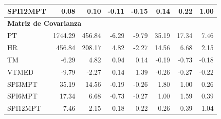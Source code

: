 \begin{table}[ht]
\begin{tabular}{lrrrrrrr}
SPI12MPT & 0.08 & 0.10 & -0.11 & -0.15 & 0.14 & 0.22 & 1.00 \\
\midrule
\multicolumn{8}{l}{\textbf{Matriz de Covarianza}} \\
\midrule
PT       & 1744.29 & 456.84 & -6.29 & -9.79 & 35.19 & 17.34 & 7.46 \\
HR       & 456.84 & 208.17 & 4.82 & -2.27 & 14.56 & 6.68 & 2.15 \\
TM       & -6.29 & 4.82 & 0.94 & 0.14 & -0.19 & -0.73 & -0.18 \\
VTMED    & -9.79 & -2.27 & 0.14 & 1.39 & -0.26 & -0.27 & -0.22 \\
SPI3MPT  & 35.19 & 14.56 & -0.19 & -0.26 & 1.80 & 1.00 & 0.26 \\
SPI6MPT  & 17.34 & 6.68 & -0.73 & -0.27 & 1.00 & 1.59 & 0.39 \\
SPI12MPT & 7.46 & 2.15 & -0.18 & -0.22 & 0.26 & 0.39 & 1.04 \\
\bottomrule
\end{tabular}
\end{table}





